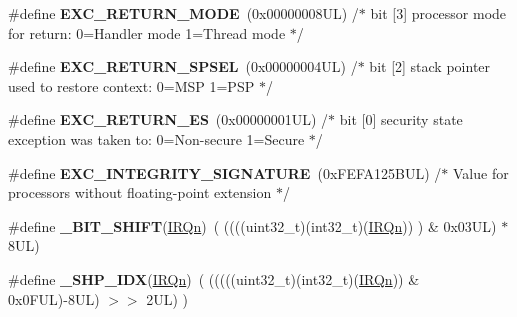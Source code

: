 \begin{DoxyCompactItemize}
\#define {\bfseries E\+X\+C\+\_\+\+R\+E\+T\+U\+R\+N\+\_\+\+M\+O\+DE}~(0x00000008\+U\+L)     /$\ast$ bit \mbox{[}3\mbox{]} processor mode for return\+: 0=\+Handler mode 1=\+Thread mode      $\ast$/
\item 
\mbox{\label{group___c_m_s_i_s___core___n_v_i_c_functions_ga686922b26c29eac540f53a6213627466}} 
\#define {\bfseries E\+X\+C\+\_\+\+R\+E\+T\+U\+R\+N\+\_\+\+S\+P\+S\+EL}~(0x00000004\+U\+L)     /$\ast$ bit \mbox{[}2\mbox{]} stack pointer used to restore context\+: 0=\+M\+S\+P 1=\+P\+S\+P           $\ast$/
\item 
\mbox{\label{group___c_m_s_i_s___core___n_v_i_c_functions_gac939dbf69d3063c76a28516a4ae84db7}} 
\#define {\bfseries E\+X\+C\+\_\+\+R\+E\+T\+U\+R\+N\+\_\+\+ES}~(0x00000001\+U\+L)     /$\ast$ bit \mbox{[}0\mbox{]} security state exception was taken to\+: 0=\+Non-\/secure 1=\+Secure $\ast$/
\item 
\mbox{\label{group___c_m_s_i_s___core___n_v_i_c_functions_ga7d1b21b2d863ccd9e23a3295b3173155}} 
\#define {\bfseries E\+X\+C\+\_\+\+I\+N\+T\+E\+G\+R\+I\+T\+Y\+\_\+\+S\+I\+G\+N\+A\+T\+U\+RE}~(0x\+F\+E\+F\+A125\+B\+U\+L)     /$\ast$ Value for processors without floating-\/point extension                $\ast$/
\item 
\mbox{\label{group___c_m_s_i_s___core___n_v_i_c_functions_ga53c75b28823441c6153269f0ecbed878}} 
\#define {\bfseries \+\_\+\+B\+I\+T\+\_\+\+S\+H\+I\+FT}(\mbox{\hyperlink{group___interrupt__vector__numbers_ga666eb0caeb12ec0e281415592ae89083}{I\+R\+Qn}})~(  ((((uint32\+\_\+t)(int32\+\_\+t)(\mbox{\hyperlink{group___interrupt__vector__numbers_ga666eb0caeb12ec0e281415592ae89083}{I\+R\+Qn}}))         )      \&  0x03\+U\+L) $\ast$ 8\+U\+L)
\item 
\mbox{\label{group___c_m_s_i_s___core___n_v_i_c_functions_gaee4f7eb5d7e770ad51489dbceabb1755}} 
\#define {\bfseries \+\_\+\+S\+H\+P\+\_\+\+I\+DX}(\mbox{\hyperlink{group___interrupt__vector__numbers_ga666eb0caeb12ec0e281415592ae89083}{I\+R\+Qn}})~( (((((uint32\+\_\+t)(int32\+\_\+t)(\mbox{\hyperlink{group___interrupt__vector__numbers_ga666eb0caeb12ec0e281415592ae89083}{I\+R\+Qn}})) \& 0x0\+F\+U\+L)-\/8\+U\+L) $>$$>$    2\+U\+L)      )
$$
\end{DoxyCompactItemize}
